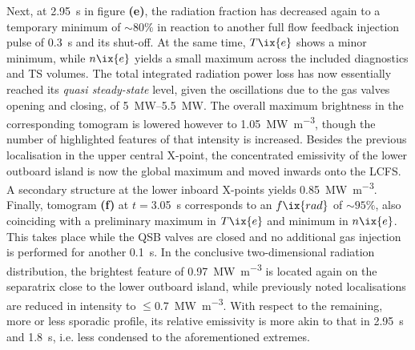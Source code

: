             Next, at \SI{2.95}{\second} in figure \textbf{(e)}, the radiation fraction has decreased again to a temporary minimum of $\sim80\%$ in reaction to another full flow feedback injection pulse of \SI{0.3}{\second} and its shut-off. At the same time, $T\ix{e}$ shows a minor minimum, while $n\ix{e}$ yields a small maximum across the included diagnostics and TS volumes. The total integrated radiation power loss has now essentially reached its \textit{quasi steady-state} level, given the oscillations due to the gas valves opening and closing, of \SIrange{5}{5.5}{\mega\watt}. The overall maximum brightness in the corresponding tomogram is lowered however to \SI{1.05}{\mega\watt\per\cubic\meter}, though the number of highlighted features of that intensity is increased. Besides the previous localisation in the upper central X-point, the concentrated emissivity of the lower outboard island is now the global maximum and moved inwards onto the LCFS. A secondary structure at the lower inboard X-points yields \SI{0.85}{\mega\watt\per\cubic\meter}.\\%
            Finally, tomogram \textbf{(f)} at $t=$\SI{3.05}{\second} corresponds  to an $f\ix{rad}$ of $\sim95\%$, also coinciding with a preliminary maximum in $T\ix{e}$ and minimum in $n\ix{e}$. This takes place while the QSB valves are closed and no additional gas injection is performed for another \SI{0.1}{\second}. In the conclusive two-dimensional radiation distribution, the brightest feature of \SI{0.97}{\mega\watt\per\cubic\meter} is located again on the separatrix close to the lower outboard island, while previously noted localisations are reduced in intensity to $\le$\SI{0.7}{\mega\watt\per\cubic\meter}. With respect to the remaining, more or less sporadic profile, its relative emissivity is more akin to that in \SI{2.95}{\second} and \SI{1.8}{\second}, i.e. less condensed to the aforementioned extremes.\\%

